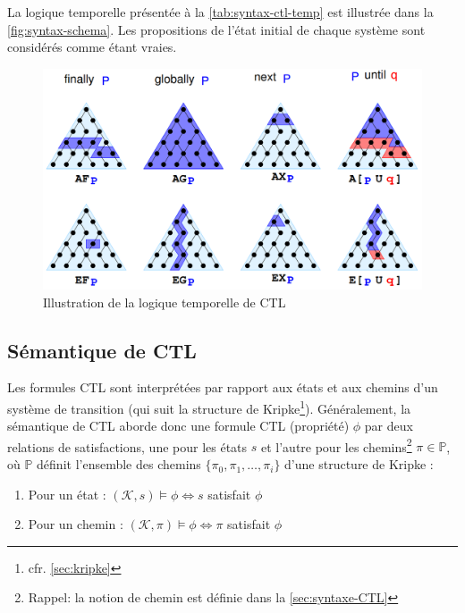 \documentclass[runningheads,a4paper,10pt]{llncs}
\begin{document}
La logique temporelle présentée à la \autoref{tab:syntax-ctl-temp} est illustrée dans la \autoref{fig:syntax-schema}. Les propositions de l'état initial de chaque système sont considérés comme étant vraies. 

\begin{figure}
  \centering
   \includegraphics[scale=0.43]{figures/syntax-schema.png}
   \caption[Caption for LOF]{Illustration de la logique temporelle de CTL \cite{artale-slides}}
   \label{fig:syntax-schema}
\end{figure}

\subsection{Sémantique de CTL} \label{sec:sem-CTL}
Les formules CTL sont interprétées par rapport aux états et aux chemins d'un système de transition (qui suit la structure de Kripke\footnote{cfr. \autoref{sec:kripke}}). Généralement, la sémantique de CTL aborde donc une formule CTL (propriété) $\phi$ par deux relations de satisfactions, une pour les états $s$ et l'autre pour les chemins\footnote{Rappel: la notion de chemin est définie dans la \autoref{sec:syntaxe-CTL}} $\pi \in \mathbb{P}$, où $\mathbb{P}$ définit l'ensemble des chemins $\{\pi_{0}, \pi_{1}, \dots, \pi_{i}\}$ d'une structure de Kripke : 

\begin{enumerate}
\item Pour un état :  $(\mathcal{K},s) \vDash \phi \Leftrightarrow s$ satisfait $\phi$ 
\item Pour un chemin : $(\mathcal{K},\pi) \vDash \phi \Leftrightarrow \pi$ satisfait $\phi$ 
\end{enumerate}
\end{document}
